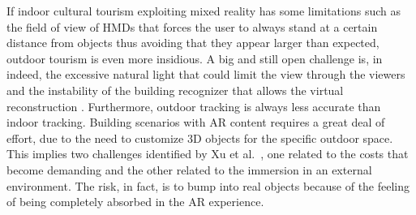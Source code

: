 If indoor cultural tourism exploiting mixed reality has some limitations such as the field of view of \glspl{HMD} that forces the user to always stand at a certain distance from objects thus avoiding that they appear larger than expected, outdoor tourism is even more insidious. A big and still open challenge is, in indeed, the excessive natural light that could limit the view through the viewers and the instability of the building recognizer that allows the virtual reconstruction \cite{debandi_enhancing_2018}. Furthermore, outdoor tracking is always less accurate than indoor tracking. Building scenarios with AR content requires a great deal of effort, due to the need to customize 3D objects for the specific outdoor space. This implies two challenges identified by Xu et al.~\cite{xu_exploring_2018}, one related to the costs that become demanding and the other related to the immersion in an external environment. The risk, in fact, is to bump into real objects because of the feeling of being completely absorbed in the AR experience.

